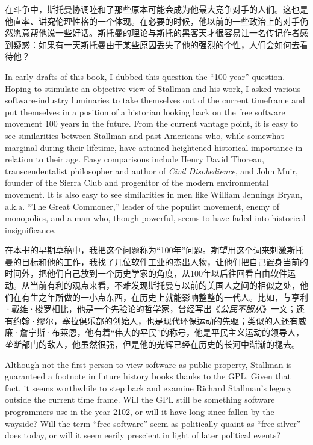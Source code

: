 \ifdefined\chs
在斗争中，斯托曼协调睦和了那些原本可能会成为他最大竞争对手的人们。这也是他直率、讲究伦理性格的一个体现。在必要的时候，他以前的一些政治上的对手仍然愿意帮他说一些好话。斯托曼的理论与斯托的黑客天才很容易让一名传记作者感到疑惑：如果有一天斯托曼由于某些原因丢失了他的强烈的个性，人们会如何去看待他？
\fi

\ifdefined\eng
In early drafts of this book, I dubbed this question the ``100 year'' question. Hoping to stimulate an objective view of Stallman and his work, I asked various software-industry luminaries to take themselves out of the current timeframe and put themselves in a position of a historian looking back on the free software movement 100 years in the future. From the current vantage point, it is easy to see similarities between Stallman and past Americans who, while somewhat marginal during their lifetime, have attained heightened historical importance in relation to their age. Easy comparisons include Henry David Thoreau, transcendentalist philosopher and author of \textit{Civil Disobedience}, and John Muir, founder of the Sierra Club and progenitor of the modern environmental movement. It is also easy to see similarities in men like William Jennings Bryan, a.k.a. ``The Great Commoner,'' leader of the populist movement, enemy of monopolies, and a man who, though powerful, seems to have faded into historical insignificance.
\fi

\ifdefined\chs
在本书的早期草稿中，我把这个问题称为“100年”问题。期望用这个词来刺激斯托曼的目标和他的工作，我找了几位软件工业的杰出人物，让他们把自己置身当前的时间外，把他们自己放到一个历史学家的角度，从100年以后往回看自由软件运动。从当前有利的观点来看，不难发现斯托曼与以前的美国人之间的相似之处，他们在有生之年所做的一小点东西，在历史上就能影响整整的一代人。比如，与亨利·戴维·梭罗相比，他是一个先验论的哲学家，曾经写出《\textit{公民不服从}》一文；还有约翰·缪尔，塞拉俱乐部的创始人，也是现代环保运动的先驱；类似的人还有威廉·詹宁斯·布莱恩，他有着“伟大的平民”的称号，他是平民主义运动的领导人，垄断部门的敌人，他虽然很强，但是他的光辉已经在历史的长河中渐渐的褪去。
\fi

\ifdefined\eng
Although not the first person to view software as public property, Stallman is guaranteed a footnote in future history books thanks to the GPL. Given that fact, it seems worthwhile to step back and examine Richard Stallman's legacy outside the current time frame. Will the GPL still be something software programmers use in the year 2102, or will it have long since fallen by the wayside? Will the term ``free software'' seem as politically quaint as ``free silver'' does today, or will it seem eerily prescient in light of later political events?
\fi

